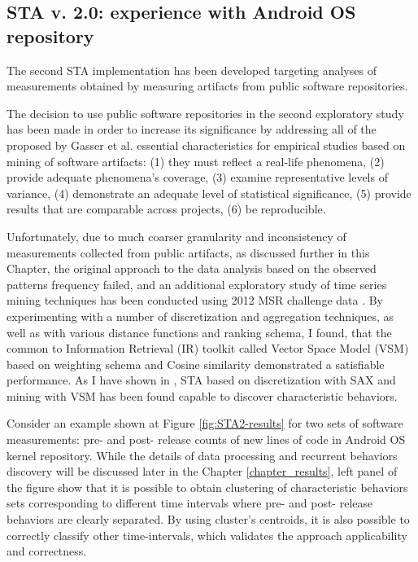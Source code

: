 \subsection{STA v. 2.0: experience with Android OS repository}
The second STA implementation has been developed targeting analyses of measurements obtained by measuring artifacts 
from public software repositories.

The decision to use public software repositories in the second exploratory study has been made in order to increase its 
significance by addressing all of the proposed by Gasser et al. \cite{citeulike:13058334} essential characteristics for 
empirical studies based on mining of software artifacts:  
(1) they must reflect a real-life phenomena, 
(2) provide adequate phenomena's coverage, 
(3) examine representative levels of variance, 
(4) demonstrate an adequate level of statistical significance,
(5) provide results that are comparable across projects,
(6) be reproducible. 

Unfortunately, due to much coarser granularity and inconsistency of measurements collected from public artifacts, 
as discussed further in this Chapter, the original approach to the data analysis based on the observed patterns frequency 
failed, and an additional exploratory study of time series mining techniques has been conducted using 2012 MSR challenge data
\cite{MSRChallenge2012}.
By experimenting with a number of discretization and aggregation techniques, as well as with various
distance functions and ranking schema, I found, that the common to Information Retrieval (IR) toolkit called 
Vector Space Model (VSM) based on \tfidf weighting schema and Cosine similarity demonstrated a satisfiable performance. 
As I have shown in \cite{csdl2-11-10}, STA based on discretization with SAX and mining with VSM has been found capable to 
discover characteristic behaviors.

Consider an example shown at Figure \ref{fig:STA2-results} for two sets of software measurements: pre- and post- release 
counts of new lines of code in Android OS kernel repository. While the details of data processing and recurrent behaviors 
discovery will be discussed later in the Chapter \ref{chapter_results}, left panel of the figure show that it is possible to
obtain clustering of characteristic behaviors sets corresponding to different time intervals where pre- and post- release 
behaviors are clearly separated. By using cluster's centroids, it is also possible to correctly classify other time-intervals,
which validates the approach applicability and correctness.

